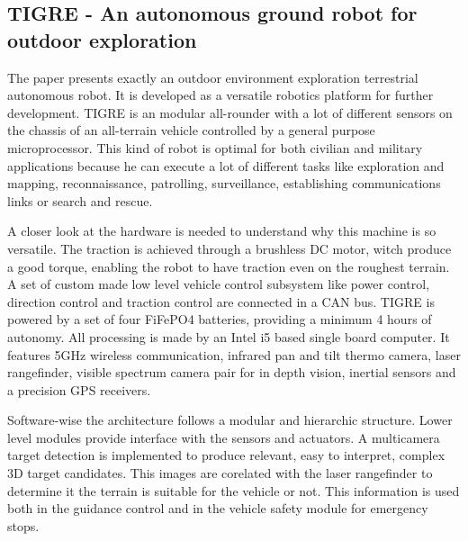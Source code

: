 \documentclass{romjist}
\begin{document}
\subsection{TIGRE - An autonomous ground robot for outdoor exploration}
\cite{1}The paper presents exactly an outdoor environment exploration terrestrial autonomous robot. It is developed as a versatile robotics platform for further development. TIGRE is an modular all-rounder with a lot of different sensors on the chassis of an all-terrain vehicle controlled by a general purpose microprocessor. This kind of robot is optimal for both civilian and military applications because he can execute a lot of different tasks like exploration and mapping, reconnaissance, patrolling, surveillance, establishing communications links or search and rescue. \par
A closer look at the hardware is needed to understand why this machine is so versatile. The traction is achieved through a brushless DC motor, witch produce a good torque, enabling the robot to have traction even on the roughest terrain. A set of custom made low level vehicle control subsystem like power control, direction control and traction control are connected in a CAN bus. TIGRE is powered by a set of four FiFePO4 batteries, providing a minimum 4 hours of autonomy. All processing is made by an Intel i5 based single board computer. It features 5GHz wireless communication, infrared pan and tilt thermo camera, laser rangefinder, visible spectrum camera pair for in depth vision, inertial sensors and a precision GPS receivers.\par      
Software-wise the architecture follows a modular and hierarchic structure. Lower level modules provide interface with the sensors and actuators. A multicamera target detection is implemented to produce relevant, easy to interpret, complex 3D target candidates. This images are corelated with the laser rangefinder to determine it the terrain is suitable for the vehicle or not. This information is used both in the guidance control and in the vehicle safety module for emergency stops.     
\end{document}
